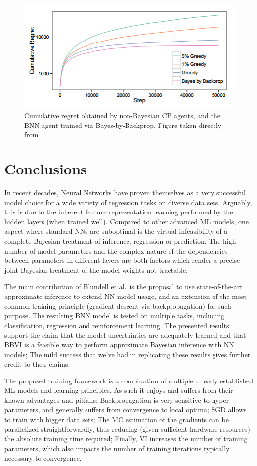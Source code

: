 \documentclass[11pt]{article}
\begin{document}
\begin{figure}
  \centering
  \includegraphics[width=.5\textwidth]{figures/cb_cumregret.png}
  \caption{Cumulative regret obtained by non-Bayesian CB agents, and the BNN
  agent trained via Bayes-by-Backprop.  Figure taken directly
  from~\cite{blundell}.}\label{fig:cb_cumregret}
\end{figure}


\section{Conclusions}

In recent decades, Neural Networks have proven themselves as a very successful
model choice for a wide variety of regression tasks on diverse data sets.
Arguably, this is due to the inherent feature representation learning performed
by the hidden layers (when trained well).  Compared to other advanced ML models,
one aspect where standard NNs are suboptimal is the virtual infeasibility of
a complete Bayesian treatment of inference, regression or prediction.  The high
number of model parameters and the complex nature of the dependencies between
parameters in different layers are both factors which render a precise joint
Bayesian treatment of the model weights not tractable.

The main contribution of Blundell et al.\ is the proposal to use
state-of-the-art approximate inference to extend NN model usage, and an
extension of the most common training principle (gradient descent via
backpropagation) for such purpose.  The resulting BNN model is tested on
multiple tasks, including classification, regression and reinforcement
learning.  The presented results support the claim that the model uncertainties
are adequately learned and that BBVI is a feasible way to perform approximate
Bayesian inference with NN models; The mild success that we've had in
replicating these results gives further credit to their claims.

The proposed training framework is a combination of multiple already
established ML models and learning principles. As such it enjoys and suffers
from their known advantages and pitfalls: Backpropagation is very sensitive to
hyper-parameters, and generally suffers from convergence to local optima;  SGD
allows to train with bigger data sets; The MC estimation of the gradients can
be parallelized straightforwardly, thus reducing (given sufficient hardware
resources) the absolute training time required; Finally, VI increases the
number of training parameters, which also impacts the number of training
iterations typically necessary to convergence.



 
\end{document}
